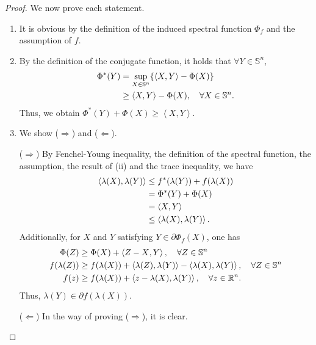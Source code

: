 \documentclass[a4paper,11pt, oneside]{book}
\theoremstyle{definition}
\newcommand{\NDemenstionalRealEuclideanSpace}{\mathbb{R}^n}
\newcommand{\NDemenstionalRealSymmetricMatrixSpace}{\mathbb{S}^n}
\newcommand{\InnerProduct}[2]{\left\langle {#1},{#2}\right\rangle} %
\newcommand{\ConjugateFunction}[1]{{#1}^*}
\begin{document}
\begin{proof}
  We now prove each statement.
  \begin{enumerate}[label=\roman*,align=CenterWithParen]
    \item It is obvious by the definition of the induced spectral function $\Phi_f$ and the assumption of $f$.
    \item By the definition of the conjugate function, it holds that $\forall Y \in \NDemenstionalRealSymmetricMatrixSpace$,
    \begin{equation}
      \begin{split}
        \ConjugateFunction{\Phi}(Y) &= \sup_{X \in \NDemenstionalRealSymmetricMatrixSpace} \{\InnerProduct{X}{Y} - \Phi(X)\} \\
        &\geq \InnerProduct{X}{Y} - \Phi(X), \quad \forall X \in \NDemenstionalRealSymmetricMatrixSpace. \notag
      \end{split}
    \end{equation}
    Thus, we obtain $\ConjugateFunction{\Phi}(Y) + \Phi(X) \geq \InnerProduct{X}{Y}$.
    \item We show ($\Rightarrow$) and ($\Leftarrow$).

    ($\Rightarrow$) By Fenchel-Young inequality, the definition of the spectral function, the assumption, the result of (ii) and the trace inequality, we have
    \begin{equation}
      \begin{split}
        \InnerProduct{\lambda(X)}{\lambda(Y)} &\leq \ConjugateFunction{f}(\lambda(Y)) + f(\lambda(X)) \\
        &= \ConjugateFunction{\Phi}(Y) + \Phi(X) \\
        &= \InnerProduct{X}{Y} \\
        &\leq \InnerProduct{\lambda(X)}{\lambda(Y)}. \notag
      \end{split}
    \end{equation}
    Additionally, for $X$ and $Y$ satisfying $Y \in \partial \Phi_f(X)$, one has
    \begin{equation}
      \begin{split}
        \Phi(Z) &\geq \Phi(X) + \InnerProduct{Z-X}{Y}, \quad \forall Z \in \NDemenstionalRealSymmetricMatrixSpace \\
        f(\lambda(Z)) &\geq f(\lambda(X)) + \InnerProduct{\lambda(Z)}{\lambda(Y)} - \InnerProduct{\lambda(X)}{\lambda(Y)}, \quad \forall Z \in \NDemenstionalRealSymmetricMatrixSpace\\
        f(z) &\geq f(\lambda(X)) + \InnerProduct{z - \lambda(X)}{\lambda(Y)}, \quad \forall z \in \NDemenstionalRealEuclideanSpace. \notag
      \end{split}
    \end{equation}
    Thus, $\lambda(Y) \in \partial f(\lambda(X))$.

    ($\Leftarrow$) In the way of proving ($\Rightarrow$), it is clear.
  \end{enumerate}
\end{proof}
\end{document}
